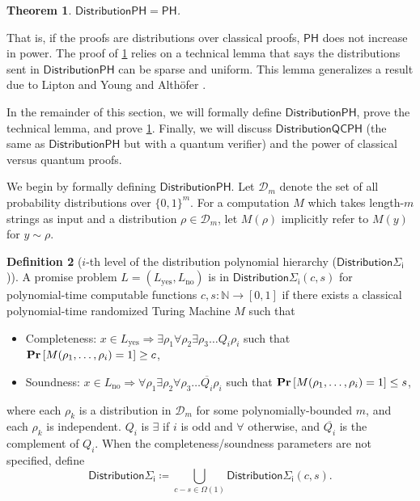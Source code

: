\documentclass[10pt,a4paper]{article}
\newtheorem{theorem}{Theorem}[section]
\theoremstyle{definition}
\newtheorem{definition}[theorem]{Definition}
\renewcommand{\Pr}{\mathop{\bf Pr\/}}
\newcommand{\nats}{\mathbb N}
\newcommand{\N}{\nats}
\newcommand{\class}[1]{\ensuremath{\mathsf{#1}}\xspace}
\newcommand{\PH}{\class{PH}}
\newcommand{\distributionPH}{\mixedPH}
\newcommand{\distributionQCPH}{\mathsf{DistributionQCPH}}
\newcommand{\mixedPH}{\class{DistributionPH}}
\newcommand{\mixedSigmai}[1][i]{\mathsf{Distribution\Sigma_{#1}}}
\newcommand{\calD}{\mathcal{D}}
\begin{document}
\begin{theorem}\label{thm:mixedph=ph}
    $\mixedPH = \PH$.
\end{theorem}


That is, if the proofs are distributions over classical proofs, $\PH$ does not increase in power.
The proof of \cref{thm:mixedph=ph} relies on a technical lemma that says the distributions sent in $\mixedPH$ can be sparse and uniform. This lemma generalizes a result due to Lipton and Young \cite{lipton1994simple} and Althöfer \cite{ALTHOFER1994339}. 

In the remainder of this section, we will formally define $\distributionPH$, prove the technical lemma, and prove \cref{thm:mixedph=ph}. 
Finally, we will discuss $\distributionQCPH$ (the same as $\distributionPH$ but with a quantum verifier) and the power of classical versus quantum proofs.


We begin by formally defining $\mixedPH$.
Let $\calD_m$ denote the set of all probability distributions over $\{0,1\}^m$.
For a computation $M$ which takes length-$m$ strings as input and a distribution $\rho\in\calD_m$, let $M(\rho)$ implicitly refer to $M(y)$ for $y\sim \rho$.

\begin{definition}[$i$-th level of the distribution polynomial hierarchy ($\mixedSigmai$)]
    A promise problem $L =(L_{\text{yes}},L_{\text{no}})$ is in $\mixedSigmai(c,s)$ for polynomial-time computable functions $c,s : \N \to [0,1]$ if there exists a classical polynomial-time randomized Turing Machine $M$ such that
    \begin{itemize}
        \item Completeness: $x\in L_{\text{yes}} \Rightarrow \exists \rho_1 \forall \rho_2 \exists \rho_3 \dots Q_i \rho_i$ such that $\Pr\left[M(\rho_1,\dots,\rho_i) = 1\right] \geq c$,
        \item Soundness: $x\in L_{\text{no}} \Rightarrow \forall \rho_1 \exists \rho_2 \forall \rho_3 \dots \overline{Q_i} \rho_i$ such that $\Pr\left[M(\rho_1,\dots,\rho_i) = 1\right] \leq s$,
    \end{itemize}
    where each $\rho_k$ is a distribution in $\calD_m$ for some polynomially-bounded $m$, and each $\rho_k$ is independent.
    $Q_i$ is $\exists$ if $i$ is odd and $\forall$ otherwise, and $\overline{Q_i}$ is the complement of $Q_i$.
    When the completeness/soundness parameters are not specified, define
    \[
        \mixedSigmai[i] \coloneqq \bigcup_{c-s\in\Omega(1)} \mixedSigmai[i](c,s).
    \]
\end{definition}
\end{document}
